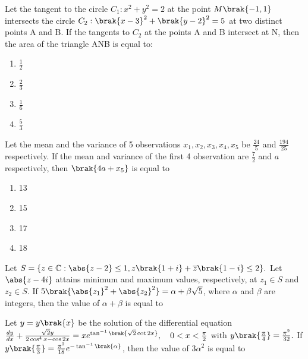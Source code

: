 \item Let the tangent to the circle $C_1: x^2+y^2=2$ at the point $M\brak{-1,1}$ intersects the circle $C_2: \brak{x-3}^2+\brak{y-2}^2=5$ at two distinct points A and B. If the tangents to $C_2$ at the points A and B intersect at N, then the area of the triangle ANB is equal to:\hfill {}

\begin{multicols}{4}
\begin{enumerate}
\item $\frac{1}{2}$
\item $\frac{2}{3}$
\item  $\frac{1}{6}$
\item $\frac{5}{3}$
\end{enumerate}
\end{multicols}

\item Let the mean and the variance of 5 observations $x_1,x_2,x_3,x_4,x_5$ be $\frac{24}{5}$ and $\frac{194}{25}$ respectively. If the mean and variance of the first 4 observation are $\frac{7}{2}$ and $a$ respectively, then $\brak{4a + x_5}$ is equal to \hfill {}

\begin{multicols}{4}
\begin{enumerate}
    \item 13
    \item 15
    \item 17
    \item 18
\end{enumerate}
\end{multicols}

\item Let $S = \{z \in \mathbb{C}: \abs{z-2} \leq 1, z\brak{1+i}+\overline{z}\brak{1-i} \leq 2\}.$ Let $\abs{z-4i}$ attains minimum and maximum values, respectively, at $z_1 \in S$ and $z_2 \in S.$ If $5\brak{\abs{z_1}^2+\abs{z_2}^2} = \alpha + \beta\sqrt{5}$, where $\alpha$ and $\beta$ are integers, then the value of $\alpha + \beta$ is equal to \hfill {}


\item Let $y = y\brak{x}$ be the solution of the differential equation \\$\frac{dy}{dx} + \frac{\sqrt{2}y}{2\cos^4 x - \cos 2x} = xe^{\tan^{-1}\brak{\sqrt{2}\cot 2x}}, \quad 0 < x < \frac{\pi}{2}$ with $y\brak{\frac{\pi}{4}} = \frac{\pi^2}{32}.$ If $y\brak{\frac{\pi}{3}} = \frac{\pi^2}{18}e^{-\tan^{-1}\brak{\alpha}}$, then the value of $3\alpha^2$ is equal to\hfill {}



